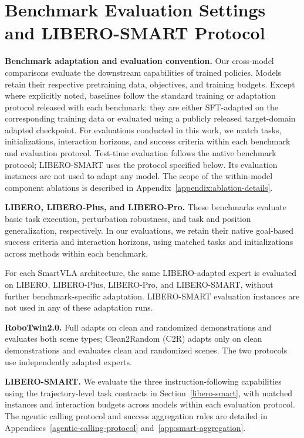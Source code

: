 \section{Benchmark Evaluation Settings and LIBERO-SMART Protocol}
\label{appendix:smart-benchmark}

\textbf{Benchmark adaptation and evaluation convention.}
Our cross-model comparisons evaluate the downstream capabilities
of trained policies. Models retain their respective pretraining
data, objectives, and training budgets. Except where explicitly
noted, baselines follow the standard training or adaptation
protocol released with each benchmark: they are either SFT-adapted
on the corresponding training data or evaluated using a publicly
released target-domain adapted checkpoint. For evaluations conducted
in this work, we match tasks, initializations, interaction horizons,
and success criteria within each benchmark and evaluation protocol.
Test-time evaluation follows the native benchmark protocol;
LIBERO-SMART uses the protocol specified below. Its evaluation
instances are not used to adapt any model. The scope of the
within-model component ablations is described in
Appendix~\ref{appendix:ablation-details}.

\textbf{LIBERO, LIBERO-Plus, and LIBERO-Pro.} These benchmarks evaluate basic task execution,
perturbation robustness, and task and position generalization, respectively. In our evaluations, we
retain their native goal-based success criteria and interaction horizons, using matched tasks and
initializations across methods within each benchmark.

For each SmartVLA architecture, the same LIBERO-adapted expert is evaluated
on LIBERO, LIBERO-Plus, LIBERO-Pro, and LIBERO-SMART, without further
benchmark-specific adaptation. LIBERO-SMART evaluation instances are not
used in any of these adaptation runs.

\textbf{RoboTwin2.0.} Full adapts on clean and randomized demonstrations and evaluates both scene
types; Clean2Random (C2R) adapts only on clean demonstrations and evaluates clean and randomized
scenes. The two protocols use independently adapted experts.

\textbf{LIBERO-SMART.} We evaluate the three instruction-following capabilities using the
trajectory-level task contracts in Section~\ref{libero-smart}, with matched instances and
interaction budgets across models within each evaluation protocol. The agentic calling protocol and
success aggregation rules are detailed in Appendices~\ref{agentic-calling-protocol}
and~\ref{app:smart-aggregation}.


